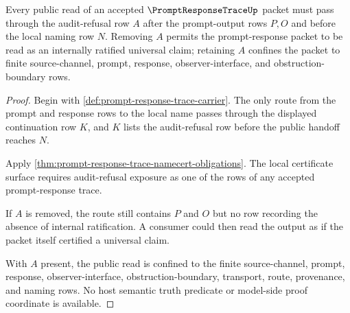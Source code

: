 \begin{theorem}
\label{thm:prompt-response-trace-audit-refusal}
Every public read of an accepted $\PromptResponseTraceUp$ packet must pass through the audit-refusal row $A$ after the prompt-output rows $P,O$ and before the local naming row $N$. Removing $A$ permits the prompt-response packet to be read as an internally ratified universal claim; retaining $A$ confines the packet to finite source-channel, prompt, response, observer-interface, and obstruction-boundary rows.
\end{theorem}
\begin{proof}
Begin with \autoref{def:prompt-response-trace-carrier}. The only route from the prompt and response rows to the local name passes through the displayed continuation row $K$, and $K$ lists the audit-refusal row before the public handoff reaches $N$.

Apply \autoref{thm:prompt-response-trace-namecert-obligations}. The local certificate surface requires audit-refusal exposure as one of the rows of any accepted prompt-response trace.

If $A$ is removed, the route still contains $P$ and $O$ but no row recording the absence of internal ratification. A consumer could then read the output as if the packet itself certified a universal claim.

With $A$ present, the public read is confined to the finite source-channel, prompt, response, observer-interface, obstruction-boundary, transport, route, provenance, and naming rows. No host semantic truth predicate or model-side proof coordinate is available.
\end{proof}

